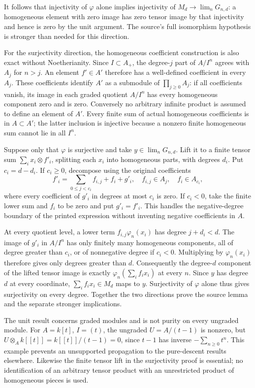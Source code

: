 It follows that injectivity of \(\varphi\) alone implies injectivity of \(M_d\to\lim_nG_{n,d}\): a homogeneous element with zero image has zero tensor image by that injectivity and hence is zero by the unit argument. The source's full isomorphism hypothesis is stronger than needed for this direction.

For the surjectivity direction, the homogeneous coefficient construction is also exact without Noetherianity. Since \(I\subset A_+\), the degree-\(j\) part of \(A/I^n\) agrees with \(A_j\) for \(n>j\). An element \(f'\in A'\) therefore has a well-defined coefficient in every \(A_j\). These coefficients identify \(A'\) as a submodule of \(\prod_{j\geq0}A_j\): if all coefficients vanish, its image in each graded quotient \(A/I^n\) has every homogeneous component zero and is zero. Conversely no arbitrary infinite product is assumed to define an element of \(A'\). Every finite sum of actual homogeneous coefficients is in \(A\subset A'\); the latter inclusion is injective because a nonzero finite homogeneous sum cannot lie in all \(I^n\).

Suppose only that \(\varphi\) is surjective and take \(y\in\lim_nG_{n,d}\). Lift it to a finite tensor sum \(\sum_i x_i\otimes f'_i\), splitting each \(x_i\) into homogeneous parts, with degrees \(d_i\). Put \(c_i=d-d_i\). If \(c_i\geq0\), decompose using the original coefficients \[
f'_i=\sum_{0\leq j<c_i}f_{i,j}+f_i+g'_i,
\quad f_{i,j}\in A_j,\quad f_i\in A_{c_i},
\] where every coefficient of \(g'_i\) in degrees at most \(c_i\) is zero. If \(c_i<0\), take the finite lower sum and \(f_i\) to be zero and put \(g'_i=f'_i\). This handles the negative-degree boundary of the printed expression without inventing negative coefficients in \(A\).

At every quotient level, a lower term \(f_{i,j}\varphi_n(x_i)\) has degree \(j+d_i<d\). The image of \(g'_i\) in \(A/I^n\) has only finitely many homogeneous components, all of degree greater than \(c_i\), or of nonnegative degree if \(c_i<0\). Multiplying by \(\varphi_n(x_i)\) therefore gives only degrees greater than \(d\). Consequently the degree-\(d\) component of the lifted tensor image is exactly \(\varphi_n(\sum_i f_ix_i)\) at every \(n\). Since \(y\) has degree \(d\) at every coordinate, \(\sum_i f_ix_i\in M_d\) maps to \(y\). Surjectivity of \(\varphi\) alone thus gives surjectivity on every degree. Together the two directions prove the source lemma and the separate stronger implications.

The unit result concerns graded modules and is not purity on every ungraded module. For \(A=k[t]\), \(I=(t)\), the ungraded \(U=A/(t-1)\) is nonzero, but \(U\otimes_A k[[t]]=k[[t]]/(t-1)=0\), since \(t-1\) has inverse \(-\sum_{n\geq0}t^n\). This example prevents an unsupported propagation to the pure-descent results elsewhere. Likewise the finite tensor lift in the surjectivity proof is essential; no identification of an arbitrary tensor product with an unrestricted product of homogeneous pieces is used.

